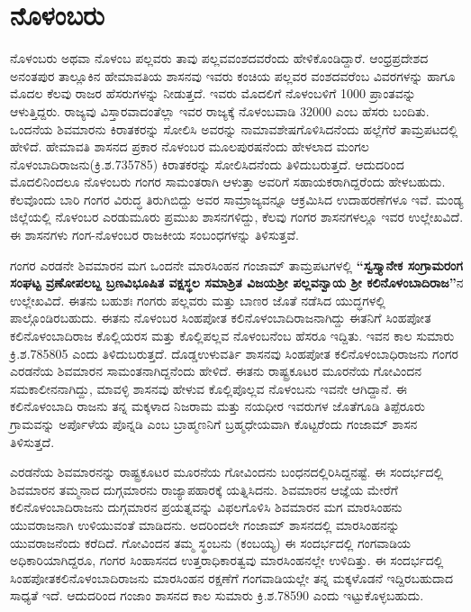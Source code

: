 \section{ನೊಳಂಬರು}

ನೊಳಂಬರು ಅಥವಾ ನೊಳಂಬ ಪಲ್ಲವರು ತಾವು ಪಲ್ಲವವಂಶದವರೆಂದು ಹೇಳಿಕೊಂಡಿದ್ದಾರೆ. ಆಂಧ್ರಪ್ರದೇಶದ ಅನಂತಪುರ ತಾಲ್ಲೂಕಿನ ಹೇಮಾವತಿಯ ಶಾಸನವು ಇವರು ಕಂಚಿಯ ಪಲ್ಲವರ ವಂಶದವರೆಂಬ ವಿವರಗಳನ್ನು ಹಾಗೂ ಮೊದಲ ಕೆಲವು ರಾಜರ ಹೆಸರುಗಳನ್ನು ನೀಡುತ್ತದೆ. ಇವರು ಮೊದಲಿಗೆ ನೊಳಂಬಳಿಗೆ 1000 ಪ್ರಾಂತವನ್ನು ಆಳುತ್ತಿದ್ದರು. ರಾಜ್ಯವು ವಿಸ್ತಾರವಾದಂತೆಲ್ಲಾ ಇವರ ರಾಜ್ಯಕ್ಕೆ ನೊಳಂಬವಾಡಿ 32000 ಎಂಬ ಹೆಸರು ಬಂದಿತು. ಒಂದನೆಯ ಶಿವಮಾರನು ಕಿರಾತಕರನ್ನು ಸೋಲಿಸಿ ಅವರನ್ನು ನಾಮಾವಶೇಷಗೊಳಿಸಿದನೆಂದು ಹಲ್ಲೆಗೆರೆ ತಾಮ್ರಪಟದಲ್ಲಿ ಹೇಳಿದೆ. ಹೇಮಾವತಿ ಶಾಸನದ ಪ್ರಕಾರ ನೊಳಂಬರ ಮೂಲಪುರಷನೆಂದು ಹೇಳಲಾದ ಮಂಗಲ ನೊಳಂಬಾದಿರಾಜನು(ಕ್ರಿ.ಶ.735\enginline{-}785) ಕಿರಾತಕರನ್ನು ಸೋಲಿಸಿದನೆಂದು ತಿಳಿದುಬರುತ್ತದೆ. ಆದುದರಿಂದ ಮೊದಲಿನಿಂದಲೂ ನೊಳಂಬರು ಗಂಗರ ಸಾಮಂತರಾಗಿ ಆಳುತ್ತಾ ಅವರಿಗೆ ಸಹಾಯಕರಾಗಿದ್ದರೆಂದು ಹೇಳಬಹುದು. ಕೆಲವೊಂದು ಬಾರಿ ಗಂಗರ ವಿರುದ್ಧ ತಿರುಗಿಬಿದ್ದು ಅವರ ಸಾಮ್ರಾಜ್ಯವನ್ನೂ ಆಕ್ರಮಿಸಿದ ಉದಾಹರಣೆಗಳೂ ಇವೆ. ಮಂಡ್ಯ ಜಿಲ್ಲೆಯಲ್ಲಿ ನೊಳಂಬರ ಎರಡುಮೂರು ಪ್ರಮುಖ ಶಾಸನಗಳಿದ್ದು, ಕೆಲವು ಗಂಗರ ಶಾಸನಗಳಲ್ಲೂ ಇವರ ಉಲ್ಲೇಖವಿದೆ. ಈ ಶಾಸನಗಳು ಗಂಗ-ನೊಳಂಬರ ರಾಜಕೀಯ ಸಂಬಂಧಗಳನ್ನು ತಿಳಿಸುತ್ತವೆ.

ಗಂಗರ ಎರಡನೇ ಶಿವಮಾರನ ಮಗ ಒಂದನೇ ಮಾರಸಿಂಹನ ಗಂಜಾಮ್ ತಾಮ್ರಪಟಗಳಲ್ಲಿ \textbf{“ಸ್ವಸ್ತ್ಯಾನೇಕ ಸಂಗ್ರಾಮರಂಗ ಸಂಘಟ್ಟ ವ್ರಣೋಪಲಬ್ದ ಬ್ರಣವಿಭೂಷಿತ ವಕ್ಷಸ್ಥಲ ಸಮಾಶ್ರಿತ ವಿಜಯಶ‍್ರೀ ಪಲ್ಲವನ್ವಾಯ ಶ‍್ರೀ ಕಲಿನೊಳಂಬಾದಿರಾಜ”}ನ ಉಲ್ಲೇಖವಿದೆ. ಈತನು ಬಹುಶಃ ಗಂಗರು ಪಲ್ಲವರು ಮತ್ತು ಬಾಣರ ಜೊತೆ ನಡೆಸಿದ ಯುದ್ಧಗಳಲ್ಲಿ ಪಾಲ್ಗೊಂಡಿರಬಹುದು. ಈತನು ನೊಳಂಬರ ಸಿಂಹಪೋತ ಕಲಿನೊಳಂಬಾದಿರಾಜನಾಗಿದ್ದು ಈತನಿಗೆ ಸಿಂಹಪೋತ ಕಲಿನೊಳಂಬಾದಿರಾಜ ಕೊಲ್ಲಿಯರಸ ಮತ್ತು ಕೊಲ್ಲಿಪಲ್ಲವ ನೊಳಂಬನೆಂಬ ಹೆಸರೂ ಇದ್ದಿತು. ಇವನ ಕಾಲ ಸುಮಾರು ಕ್ರಿ.ಶ.785\enginline{-}805 ಎಂದು ತಿಳಿದುಬರುತ್ತದೆ. ದೊಡ್ಡಉಳುವರ್ತಿ ಶಾಸನವು ಸಿಂಹಪೋತ ಕಲಿನೊಳಂಬಾಧಿರಾಜನು ಗಂಗರ ಎರಡನೆಯ ಶಿವಮಾರನ ಸಾಮಂತನಾಗಿದ್ದನೆಂದು ಹೇಳಿದೆ. ಈತನು ರಾಷ್ಟ್ರಕೂಟರ ಮೂರನೆಯ ಗೋವಿಂದನ ಸಮಕಾಲೀನನಾಗಿದ್ದು, ಮಾವಳ್ಳಿ ಶಾಸನವು ಹೇಳುವ ಕೊಲ್ಲಿಪೊಲ್ಲವ ನೊಳಂಬನು ಇವನೇ ಆಗಿದ್ದಾನೆ. ಈ ಕಲಿನೊಳಂಬಾದಿ ರಾಜನು ತನ್ನ ಮಕ್ಕಳಾದ ನಿಜರಾಮ ಮತ್ತು ನಯಧೀರ ಇವರುಗಳ ಜೊತೆಗೂಡಿ ತಿಪ್ಪೆರೂರು ಗ್ರಾಮವನ್ನು ಅರ್ಪೊಳೆಯ ಪೊನ್ನಡಿ ಎಂಬ ಬ್ರಾಹ್ಮಣನಿಗೆ ಬ್ರಹ್ಮಧೇಯವಾಗಿ ಕೊಟ್ಟರೆಂದು ಗಂಜಾಮ್ ಶಾಸನ ತಿಳಿಸುತ್ತದೆ.

ಎರಡನೆಯ ಶಿವಮಾರನನ್ನು ರಾಷ್ಟ್ರಕೂಟರ ಮೂರನೆಯ ಗೋವಿಂದನು ಬಂಧನದಲ್ಲಿರಿಸಿದ್ದನಷ್ಟೆ. ಈ ಸಂದರ್ಭದಲ್ಲಿ ಶಿವಮಾರನ ತಮ್ಮನಾದ ದುಗ್ಗಮಾರನು ರಾಜ್ಯಾಪಹಾರಕ್ಕೆ ಯತ್ನಿಸಿದನು. ಶಿವಮಾರನ ಆಜ್ಞೆಯ ಮೇರೆಗೆ ಕಲಿನೊಳಂಬಾದಿ\-ರಾಜನು ದುಗ್ಗಮಾರನ ಪ್ರಯತ್ನವನ್ನು ವಿಫಲಗೊಳಿಸಿ ಶಿವಮಾರನ ಮಗ ಮಾರಸಿಂಹನು ಯುವರಾಜನಾಗಿ ಉಳಿಯುವಂತೆ ಮಾಡಿದನು. ಅದರಿಂದಲೇ ಗಂಜಾಮ್ ಶಾಸನದಲ್ಲಿ ಮಾರಸಿಂಹನನ್ನು ಯುವರಾಜನೆಂದು ಕರೆದಿದೆ. ಗೋವಿಂದನ ತಮ್ಮ ಸ್ಥಂಬನು (ಕಂಬಯ್ಯ) ಈ ಸಂದರ್ಭದಲ್ಲಿ ಗಂಗವಾಡಿಯ ಅಧಿಕಾರಿಯಾಗಿದ್ದರೂ, ಗಂಗರ ಸಿಂಹಾಸನದ ಉತ್ತರಾಧಿಕಾರತ್ವವು ಮಾರಸಿಂಹನಲ್ಲೇ ಉಳಿದಿತ್ತು. ಈ ಸಂದರ್ಭದಲ್ಲಿ ಸಿಂಹಪೋತಕಲಿನೊಳಂಬಾದಿರಾಜನು ಮಾರಸಿಂಹನ ರಕ್ಷಣೆಗೆ ಗಂಗವಾಡಿ\-ಯಲ್ಲೇ ತನ್ನ ಮಕ್ಕಳೊಡನೆ ಇದ್ದಿರಬಹುದಾದ ಸಾಧ್ಯತೆ ಇದೆ. ಆದುದರಿಂದ ಗಂಜಾಂ ಶಾಸನದ ಕಾಲ ಸುಮಾರು ಕ್ರಿ.ಶ.785\enginline{-}90 ಎಂದು ಇಟ್ಟುಕೊಳ್ಳಬಹುದು.

